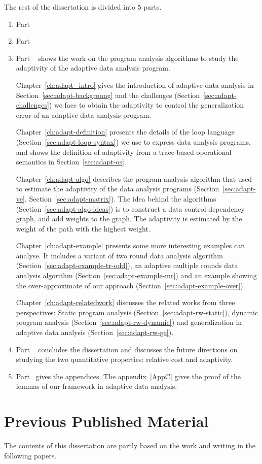 The rest of the dissertation is divided into $5$ parts. 
\begin{enumerate}
    \item Part ~ 
    
    \item Part ~
    
    \item Part ~{\ADAPTSYSTEM} shows the work on the program analysis algorithms to study the adaptivity of the adaptive data analysis program.    

Chapter~\ref{ch:adapt_intro} gives the introduction of adaptive data analysis in Section~\ref{sec:adapt-backgroung} and the challenges (Section~\ref{sec:adapt-challenges}) we face to obtain the adaptivity to control the generalization error of an adaptive data analysis program.

Chapter~\ref{ch:adapt-definition} presents the details of the loop language (Section~\ref{sec:adapt-loop-syntax}) we use to express data analysis programs, and shows the definition of adaptivity from a trace-based operational semantics in Section~\ref{sec:adapt-os}. 


Chapter~\ref{ch:adapt-algo} describes the program analysis algorithm {\ADAPTSYSTEM} that used to estimate the adaptivity of the data analysis programs (Section~\ref{sec:adapt-ve}, Section~\ref{sec:adapt-matrix}). 
The idea behind the algorithms (Section~\ref{sec:adapt-algo-ideas}) is to construct a data control dependency graph, and add weights to the graph. The adaptivity is estimated by the weight of the path with the highest weight.

Chapter~\ref{ch:adapt-example} presents some more interesting examples {\ADAPTSYSTEM} can analyse. 
It includes a variant of two round data analysis algorithm (Section~\ref{sec:adapt-example-tr-odd}), 
an adaptive multiple rounds data analysis algorithm (Section~\ref{sec:adapt-example-mr}) and an example showing the over-approximate of our approach (Section~\ref{sec:adapt-example-over}). 

Chapter~\ref{ch:adapt-relatedwork} discusses the related works from three perspectives: Static program analysis (Section~\ref{sec:adapt-rw-static}), dynamic program analysis (Section~\ref{sec:adapt-rw-dynamic}) and generalization in adaptive data analysis (Section~\ref{sec:adapt-rw-ge}).  
\item Part  ~ concludes the dissertation and discusses the future directions on studying the two quantitative properties: relative cost and adaptivity.
\item Part  ~gives the appendices. 
 The appendix~\ref{AppC} gives the proof of the lemmas of our framework in adaptive data analysis.    
\end{enumerate}



\section{Previous Published Material}
The contents of this dissertation are partly based on the work and writing in the following papers.



